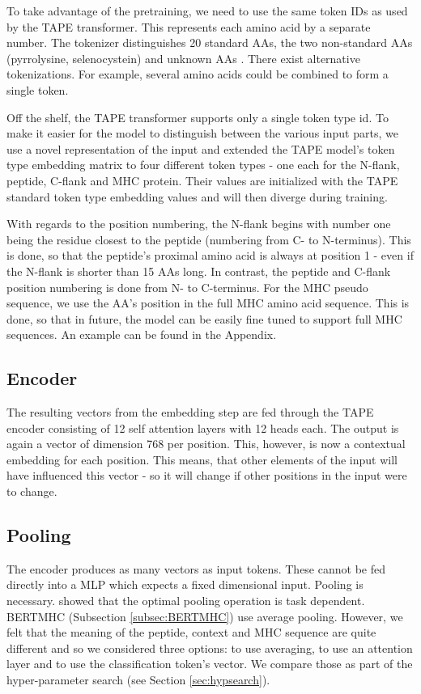 \documentclass[msc,deptreport,ai]{infthesis} %
\begin{document}
			To take advantage of the pretraining, we need to use the same token IDs as used by the \gls{TAPE} transformer. This represents each amino acid by a separate number. The tokenizer distinguishes 20 standard \glspl{AA}, the two non-standard \glspl{AA} (pyrrolysine, selenocystein) and unknown \glspl{AA} \cite{rao_evaluating_2019}. There exist alternative tokenizations. For example, several amino acids could be combined to form a single token.			
		
			Off the shelf, the \gls{TAPE} transformer supports only a single token type id. To make it easier for the model to distinguish between the various input parts, we use a novel representation of the input and extended the \gls{TAPE} model's token type embedding matrix to four different token types - one each for the N-flank, peptide, C-flank and \gls{MHC} protein. Their values are initialized with the \gls{TAPE} standard token type embedding values and will then diverge during training. 
			
			With regards to the position numbering, the N-flank begins with number one being the residue closest to the peptide (numbering from C- to N-terminus). This is done, so that the peptide's proximal amino acid is always at position 1 - even if the  N-flank is shorter than 15 \glspl{AA} long. In contrast, the peptide and C-flank position numbering is done from N- to C-terminus. For the \gls{MHC} pseudo sequence, we use the \gls{AA}'s position in the full \gls{MHC} amino acid sequence. This is done, so that in future, the model can be easily fine tuned to support full \gls{MHC} sequences. An example can be found in the Appendix.
		
		\subsection{Encoder}
			The resulting vectors from the embedding step are fed through the \gls{TAPE} encoder consisting of 12 self attention layers with 12 heads each. The output is again a vector of dimension 768 per position. This, however,  is now a contextual embedding for each position. This means,  that other elements of the input will have influenced this vector - so it will change if other positions in the input were to change.
			
		\subsection{Pooling}
		\label{subsec:pooling}
			The encoder produces as many vectors as input tokens. These cannot be fed directly into a \gls{MLP} which expects a fixed dimensional input. Pooling is necessary. \cite{toshniwal_cross-task_2020} showed that the optimal pooling operation is task dependent. BERTMHC (Subsection \ref{subsec:BERTMHC}) use average pooling. However, we felt that the meaning of the peptide, context and \gls{MHC} sequence are quite different and so we considered three options: to use averaging, to use an attention layer and to use the classification token's vector. We compare those as part of the hyper-parameter search (see Section \ref{sec:hypsearch}).
			
\end{document}

